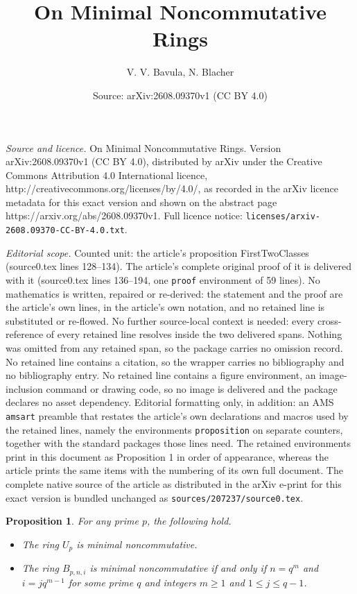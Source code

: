 \documentclass[10pt,a4paper]{amsart}
\title{On Minimal Noncommutative Rings}
\author{V. V. Bavula, N. Blacher}
\date{Source: arXiv:2608.09370v1 (CC BY 4.0)}
\newtheorem{proposition}{Proposition}
\begin{document}
\maketitle

\noindent\emph{Source and licence.} On Minimal Noncommutative Rings. Version arXiv:2608.09370v1 (CC BY 4.0), distributed by arXiv under the Creative Commons Attribution 4.0 International licence, http://creativecommons.org/licenses/by/4.0/, as recorded in the arXiv licence metadata for this exact version and shown on the abstract page https://arxiv.org/abs/2608.09370v1. Full licence notice: \texttt{licenses/arxiv-2608.09370-CC-BY-4.0.txt}.\par\smallskip

\noindent\textit{Editorial scope.} Counted unit: the article's proposition FirstTwoClasses (source0.tex lines 128--134). The article's complete original proof of it is delivered with it (source0.tex lines 136--194, one \texttt{proof} environment of 59 lines). No mathematics is written, repaired or re-derived: the statement and the proof are the article's own lines, in the article's own notation, and no retained line is substituted or re-flowed.  No further source-local context is needed: every cross-reference of every retained line resolves inside the two delivered spans.  Nothing was omitted from any retained span, so the package carries no omission record.  No retained line contains a citation, so the wrapper carries no bibliography and no bibliography entry.  No retained line contains a figure environment, an image-inclusion command or drawing code, so no image is delivered and the package declares no asset dependency.  Editorial formatting only, in addition: an AMS \texttt{amsart} preamble that restates the article's own declarations and macros used by the retained lines, namely the environments \texttt{proposition} on separate counters, together with the standard packages those lines need.  The retained environments print in this document as Proposition 1 in order of appearance, whereas the article prints the same items with the numbering of its own full document.  The complete native source of the article as distributed in the arXiv e-print for this exact version is bundled unchanged as \texttt{sources/207237/source0.tex}.
\begin{proposition}\label{FirstTwoClasses}
For any prime $p$, the following hold.
\begin{itemize}[topsep=0pt]
\item[(1)] The ring $U_p$ is minimal noncommutative.
\item[(2)] The ring $B_{p,n,i}$ is minimal noncommutative if and only if $n=q^m$ and $i=jq^{m-1}$ for some prime $q$ and integers $m\geq 1$ and $1\leq j\leq q-1$.
\end{itemize}
\end{proposition}
\end{document}
